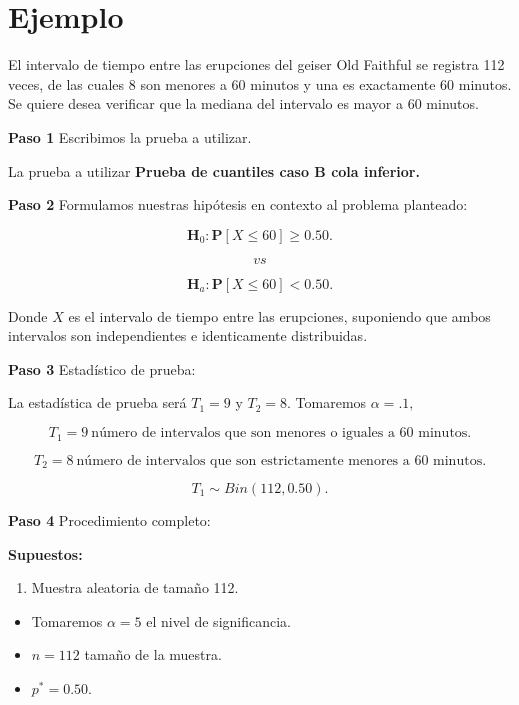 \documentclass[
  a4paper,
  oneside,
  openany]{book}
\providecommand{\tightlist}{%
  \setlength{\itemsep}{0pt}\setlength{\parskip}{0pt}}
\begin{document}
\hypertarget{ejemplo-1}{%
\section{Ejemplo}\label{ejemplo-1}}

El intervalo de tiempo entre las erupciones del geiser Old Faithful se registra 112 veces, de las cuales 8 son menores a 60 minutos y una es exactamente 60 minutos. Se quiere desea verificar que la mediana del intervalo es mayor a 60 minutos.

\textbf{Paso 1} Escribimos la prueba a utilizar.

La prueba a utilizar \textbf{Prueba de cuantiles caso B cola inferior.}

\textbf{Paso 2} Formulamos nuestras hipótesis en contexto al problema planteado:

\[\textbf{H}_0: \mathbf{P}[X \leq 60]\geq 0.50.\]

\[vs\]

\[\textbf{H}_a:  \mathbf{P}[X \leq 60]<0.50.\]

Donde \(X\) es el intervalo de tiempo entre las erupciones, suponiendo que ambos intervalos son independientes e identicamente distribuidas.

\textbf{Paso 3} Estadístico de prueba:

La estadística de prueba será \(T_1=9\) y \(T_2=8\). Tomaremos \(\alpha=.1,\)

\[T_{1}=9 \ \mbox{número  de  intervalos que  son menores o iguales  a 60 minutos.}\]

\[T_{2}=8 \ \mbox{número  de  intervalos que  son estrictamente menores a 60 minutos.}\]

\[T_{1}\sim Bin(112,0.50).\]

\textbf{Paso 4} Procedimiento completo:

\textbf{Supuestos:}

\begin{enumerate}
\def\labelenumi{\arabic{enumi}.}
\tightlist
\item
  Muestra aleatoria de tamaño 112.
\end{enumerate}

\begin{itemize}
\item
  Tomaremos \(\alpha = 5%
  \) el nivel de significancia.
\item
  \(n = 112\) tamaño de la muestra.
\item
  \(p^* = 0.50.\)
\end{itemize}
\end{document}
